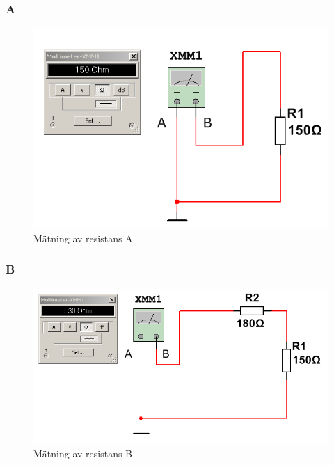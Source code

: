 \documentclass[11pt,a4paper]{article}
\begin{document}
\subsubsection{A}
\begin{figure}[H]
    \centering
    \includegraphics[scale=0.5]{ee466multisim/4a.png}
    \caption{Mätning av resistans A}
    \label{fig:sim-4a}
\end{figure}

\subsubsection{B}
\begin{figure}[H]
    \centering
    \includegraphics[scale=0.5]{ee466multisim/4b.png}
    \caption{Mätning av resistans B}
    \label{fig:sim-4b}
\end{figure}
\end{document}
